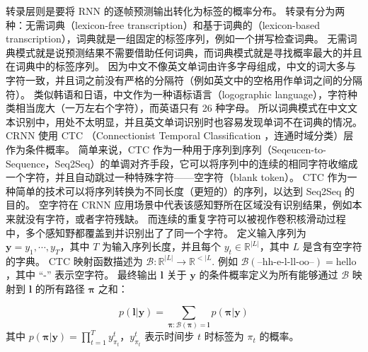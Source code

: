 转录层则是要将 RNN 的逐帧预测输出转化为标签的概率分布。
转录有分为两种：无需词典（lexicon-free transcription）和基于词典的（lexicon-based transcription），词典就是一组固定的标签序列，例如一个拼写检查词典。
无需词典模式就是说预测结果不需要借助任何词典，而词典模式就是寻找概率最大的并且在词典中的标签序列。
因为中文不像英文单词由许多字母组成，中文的词大多与字符一致，并且词之前没有严格的分隔符（例如英文中的空格用作单词之间的分隔符）。
类似韩语和日语，中文作为一种语标语言（logographic language），字符种类相当庞大（一万左右个字符），而英语只有 26 种字母。
所以词典模式在中文文本识别中，用处不太明显，并且英文单词识别时也容易发现单词不在词典的情况。
CRNN 使用 CTC （Connectionist Temporal Classification ，连通时域分类）\cite{CTC}层作为条件概率。
简单来说，CTC 作为一种用于序列到序列（Seqeucen-to-Sequence，Seq2Seq）的单调对齐手段，它可以将序列中的连续的相同字符收缩成一个字符，并且自动跳过一种特殊字符——空字符（blank token）。
CTC 作为一种简单的技术可以将序列转换为不同长度（更短的）的序列，以达到 Seq2Seq 的目的。
空字符在 CRNN 应用场景中代表该感知野所在区域没有识别结果，例如本来就没有字符，或者字符残缺。
而连续的重复字符可以被视作卷积核滑动过程中，多个感知野都覆盖到并识别出了了同一个字符。
定义输入序列为 $\bm{y} = y_1, \cdots, y_T$，其中 $T$ 为输入序列长度，并且每个 $y_t \in \mathbb{R}^{|L|}$，其中 $L$ 是含有空字符的字典。
CTC 映射函数描述为 $\mathcal{B}: \mathbb{R}^{|L|} \rightarrow \mathbb{R}^{<|L}$.
例如 $\mathcal{B}(\text{--hh-e-l-ll-oo--}) = \text{hello}$，其中 “-” 表示空字符。
最终输出 $\bm{l}$ 关于 $\bm{y}$ 的条件概率定义为所有能够通过 $\mathcal{B}$ 映射到 $\bm{l}$ 的所有路径 $\bm{\pi}$ 之和：

\begin{equation}
	p(\bm{l} | \bm{y}) = \sum_{\bm{\pi}: \mathcal{B}(\bm{\pi}) = \bm{l}} p(\bm{\pi} | \bm{y})
\end{equation}
其中 $p(\bm{\pi} | \bm{y}) = \prod_{t=1}^T y_{\pi_t}^t$，$y_{\pi_t}^t$ 表示时间步 $t$ 时标签为 $\pi_t$ 的概率。

